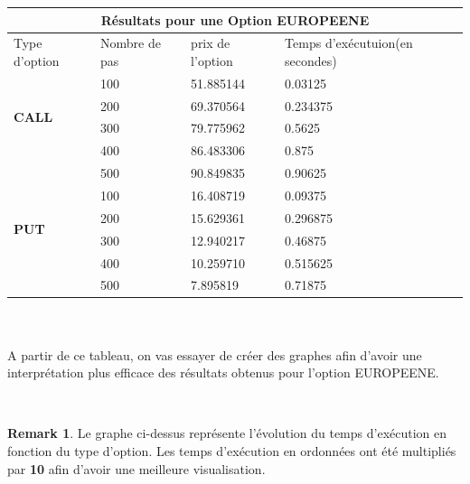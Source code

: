 \documentclass[12pt]{article}
\theoremstyle{definition}
\theoremstyle{definition}
\newtheorem*{remark}{Remark}
\begin{document}
\begin{tabular}{|l|l|l|l|}
  \hline
  \multicolumn{4}{|c|}{Résultats  pour une \textbf{Option EUROPEENE} } \\
  \hline
  Type d'option & Nombre de pas & prix de l'option & Temps d'exécutuion(en secondes)\\ \hline
  \multirow{4}{*}{\textbf{CALL}} & 100 & 51.885144 & 0.03125 \\
    & 200 & 69.370564 & 0.234375 \\
    & 300 & 79.775962 & 0.5625\\
    & 400 & 86.483306 & 0.875 \\ 
    & 500 & 90.849835 & 0.90625 \\ \hline
  \multirow{4}{*}{\textbf{PUT}} & 100 & 16.408719 & 0.09375 \\
    & 200 & 15.629361 & 0.296875 \\
    & 300 & 12.940217 & 0.46875 \\
    & 400 & 10.259710 & 0.515625 \\
    & 500 & 7.895819 & 0.71875 \\ \hline
\end{tabular} \\ \\

A partir de ce tableau, on vas essayer de créer des graphes afin d'avoir une interprétation plus efficace des résultats obtenus pour l'option EUROPEENE. \newline

 \\
\begin{remark}
Le graphe ci-dessus représente l'évolution du temps d'exécution en fonction du type d'option.
Les temps d'exécution en ordonnées ont été multipliés par \textbf{10} afin d'avoir une meilleure visualisation.
\end{remark}
\end{document}
